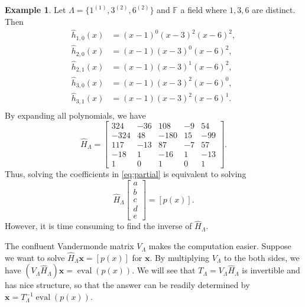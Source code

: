 \documentclass{article}
\theoremstyle{definition}
\newtheorem{example}[theorem]{Example}
\newcommand{\bx}{\mathbf{x}}
\newcommand{\eval}{\operatorname{eval}}
\begin{document}
\begin{example}
\label{ex:parbyhh}
Let $\Lambda = \{1^{(1)},3^{(2)},6^{(2)}\}$ and $\mathbb{F}$ a field where $1,3,6$ are distinct.  Then  
\[
    \begin{aligned}
        \hat{h}_{1,0}(x) &= (x - 1)^0(x - 3)^2(x - 6)^2, \\
        \hat{h}_{2,0}(x) &= (x - 1)(x - 3)^0(x - 6)^2, \\
        \hat{h}_{2,1}(x) &= (x - 1)(x - 3)^1(x - 6)^2, \\
        \hat{h}_{3,0}(x) &= (x - 1)(x - 3)^2(x - 6)^0, \\
        \hat{h}_{3,1}(x) &= (x - 1)(x - 3)^2(x - 6)^1. \\
    \end{aligned}
\]
By expanding all polynomials, we have 
\[
    \hat{H}_\Lambda = \begin{bmatrix}
        324 & -36 & 108 & -9 & 54 \\
        -324 & 48 & -180 & 15 & -99 \\
        117 & -13 & 87 & -7 & 57 \\
        -18 & 1 & -16 & 1 & -13 \\
        1 & 0 & 1 & 0 & 1
    \end{bmatrix}.
\]
Thus, solving the coefficients in \cref{eq:partial} is equivalent to solving 
\[
    \hat{H}_\Lambda 
    \begin{bmatrix} a \\ b \\ c \\ d \\ e \end{bmatrix}
    = 
    [p(x)].
\]
However, it is time consuming to find the inverse of $\hat{H}_\Lambda$.
\end{example}

The confluent Vandermonde matrix $V_\Lambda$ makes the computation easier.  Suppose we want to solve $\hat{H}_\Lambda \bx = [p(x)]$ for $\bx$.  By multiplying $V_\Lambda$ to the both sides, we have $(V_\Lambda \hat{H}_\Lambda) \bx = \eval(p(x))$.  We will see that $T_\Lambda = V_\Lambda \hat{H}_\Lambda$ is invertible and has nice structure, so that the answer can be readily determined by $\bx = T_\Lambda^{-1} \eval(p(x))$.  
\end{document}
